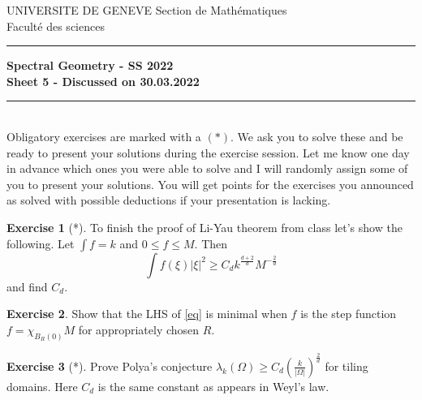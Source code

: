 \documentclass[a4paper,11pt]{article}
\theoremstyle{definition}
\newtheorem{exercise}{Exercise}
\begin{document}
\pagestyle{headings}
\noindent UNIVERSITE DE GENEVE \hfill Section de Mathématiques\\
\noindent Facult\'e des sciences \hfill \\[-3mm]
\hrule

\large

\begin{center}
\textbf{Spectral Geometry - SS 2022 \\ Sheet 5 - Discussed on 30.03.2022}
\end{center}
\hrule
\text{}\\[1cm]

Obligatory exercises are marked with a $(*)$. We ask you to solve these and be ready to present your solutions during the exercise session. Let me know one day in advance which ones you were able to solve and I will randomly assign some of you to present your solutions. You will get points for the exercises you announced as solved with possible deductions if your presentation is lacking.

\begin{exercise}[*]
	To finish the proof of Li-Yau theorem from class let's show the following. Let $\int f = k$ and $0 \leq f \leq M$. Then
	\begin{equation}
	\label{eq}
		\int f(\xi) |\xi|^2 \geq C_d k^{\frac{d+2}{d}} M^{-\frac{2}{d}}
	\end{equation}
	and find $C_d$.
\end{exercise}

\begin{exercise}
	Show that the LHS of \eqref{eq} is minimal when $f$ is the step function $f = \chi_{B_R(0)} M$ for appropriately chosen $R$.
\end{exercise}

\begin{exercise}[*]
	Prove Polya's conjecture $\lambda_k(\Omega) \geq C_d \left( \frac{k}{|\Omega|}\right)^\frac{2}{d}$ for tiling domains. Here $C_d$ is the same constant as appears in Weyl's law.
\end{exercise}
\end{document}
